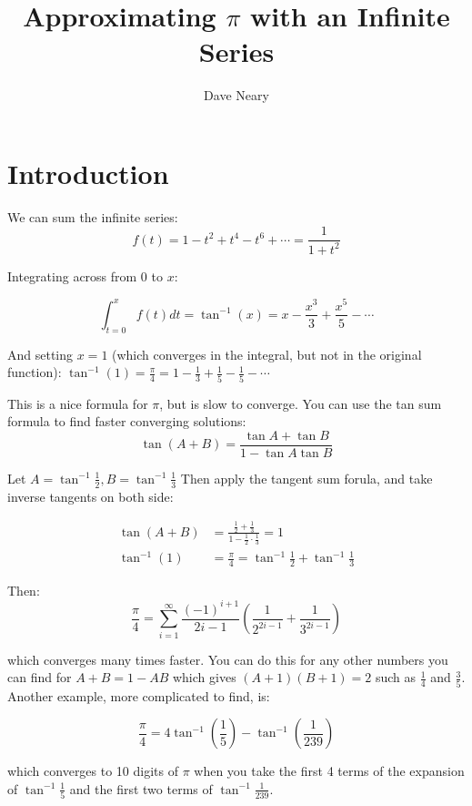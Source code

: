 \documentclass[10pt,oneside,landscape]{article}
\begin{document}
\title{Approximating $\pi$ with an Infinite Series}
\author{Dave Neary}

\maketitle

\section{Introduction}

We can sum the infinite series:
\[f(t) = 1-t^2+t^4-t^6+\cdots = \frac{1}{1+t^2} \]

Integrating across from 0 to $x$:

\[\int_{t=0}^x f(t) dt = \tan^{-1}(x) = x-\frac{x^3}{3}+\frac{x^5}{5} - \cdots\]

And setting $x=1$ (which converges in the integral, but not in the original function):
$\tan^{-1}(1) = \frac{\pi}{4} = 1-\frac{1}{3}+\frac{1}{5}-\frac{1}{5} - \cdots$

\bigskip

This is a nice formula for $\pi$, but is slow to converge. You can use the tan sum formula to
find faster converging solutions:
\[\tan(A+B) = \frac{\tan A + \tan B}{1-\tan A \tan B}\]

Let $A=\tan^{-1} \frac{1}{2}, B=\tan^{-1} \frac{1}{3}$ Then apply the tangent sum forula, and take
inverse tangents on both side:

\begin{align*}
\tan(A+B) &= \frac{\frac{1}{2}+\frac{1}{3}}{1-\frac{1}{2}\cdot\frac{1}{3}} = 1 \\
\tan^{-1}(1) & = \frac{\pi}{4} = \tan^{-1}\frac{1}{2} + \tan^{-1}\frac{1}{3}
\end{align*}

\bigskip

Then:
\[\displaystyle \frac{\pi}{4} = \sum_{i=1}^{\infty} \frac{(-1)^{i+1}}{2i-1} \left( \frac{1}{2^{2i-1}} + \frac{1}{3^{2i-1}}\right)\]

which converges many times faster. You can do this for any other numbers you can find for
$A+B=1-AB$ which gives $(A+1)(B+1) = 2$ such as $\frac{1}{4}$ and $\frac{3}{5}$.
Another example, more complicated to find, is:

\[\frac{\pi}{4} = 4\tan^{-1}\left(\frac{1}{5}\right) - \tan^{-1}\left(\frac{1}{239}\right)\]

which converges to 10 digits of $\pi$ when you take the first 4 terms of the expansion of
$\tan^{-1} \frac{1}{5}$ and the first two terms of $\tan^{-1} \frac{1}{239}$.
\end{document}
